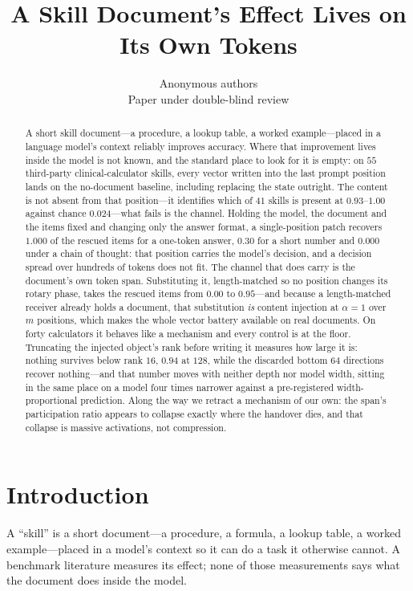 \documentclass{article}
\title{A Skill Document's Effect Lives on Its Own Tokens}
\author{Anonymous authors \\
Paper under double-blind review}
\begin{document}
\maketitle

\begin{abstract}
A short skill document---a procedure, a lookup table, a worked example---placed
in a language model's context reliably improves accuracy. Where that improvement
lives inside the model is not known, and the standard place to look for it is
empty: on $55$ third-party clinical-calculator skills, every vector written into
the last prompt position lands on the no-document baseline, including replacing
the state outright. The content is not absent from that position---it identifies
which of $41$ skills is present at $0.93$--$1.00$ against chance $0.024$---what
fails is the channel. Holding the model, the document and the items fixed and
changing only the answer format, a single-position patch recovers $1.000$ of the
rescued items for a one-token answer, $0.30$ for a short number and
$\mathbf{0.000}$ under a chain of thought: that position carries the model's
decision, and a decision spread over hundreds of tokens does not fit. The
channel that does carry is the document's own token span. Substituting it,
length-matched so no position changes its rotary phase, takes the rescued items
from $0.00$ to $0.95$---and because a length-matched receiver already holds a
document, that substitution \emph{is} content injection at $\alpha=1$ over $m$
positions, which makes the whole vector battery available on real documents. On
forty calculators it behaves like a mechanism and every control is at the floor.
Truncating the injected object's rank before writing it measures how large it
is: nothing survives below rank $16$, $0.94$ at $128$, while the discarded
bottom $64$ directions recover nothing---and that number moves with neither
depth nor model width, sitting in the same place on a model four times narrower
against a pre-registered width-proportional prediction. Along the way we retract
a mechanism of our own: the span's participation ratio appears to collapse
exactly where the handover dies, and that collapse is massive activations, not
compression.
\end{abstract}

\section{Introduction}

A ``skill'' is a short document---a procedure, a formula, a lookup table, a
worked example---placed in a model's context so it can do a task it otherwise
cannot. A benchmark literature measures its effect; none of those measurements
says what the document does inside the model.
\end{document}

